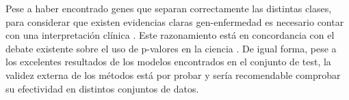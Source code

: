 Pese a haber encontrado genes que separan correctamente las distintas clases, para considerar que existen evidencias claras gen-enfermedad es necesario contar con una interpretación clínica \cite{Drier2011}. Este razonamiento está en concordancia con el debate existente sobre el uso de p-valores en la ciencia \cite{Evans1988, Goodman1999, Matthews2000}. De igual forma, pese a los excelentes resultados de los modelos encontrados en el conjunto de test, la validez externa de los métodos está por probar \cite{Steckler2008} y sería recomendable comprobar su efectividad en distintos conjuntos de datos.